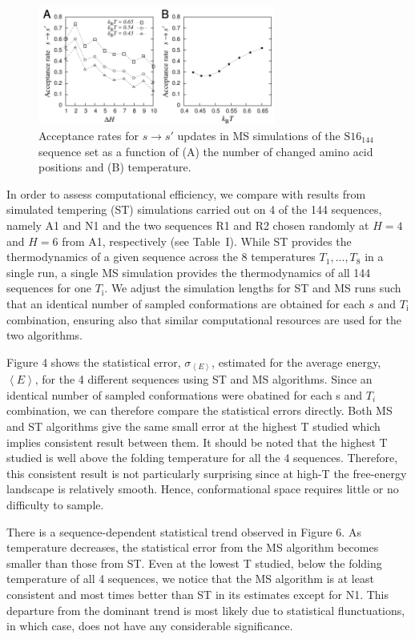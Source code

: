 \documentclass[%
 aip,
rsi,%
 amsmath,amssymb,
 reprint,%
]{revtex4-1}
\newcommand	 {\sbar}	{{s}}
\newcommand {\sigE}	{{\sigma_{\left < E \right >}}}
\newcommand {\SR}		{${\mathrm{S16}_{144}}$}
\begin{document}
\begin{figure}
\includegraphics[width=7.8cm]{Pacc}
\caption{Acceptance rates for $\sbar\rightarrow\sbar'$ updates in MS simulations of the {\SR} sequence set as a function of (A) the number of changed amino acid positions  and (B) temperature. }
\end{figure}

In order to assess computational efficiency, we compare with results from simulated tempering (ST) simulations carried out on 4 of the 144 sequences, namely A1 and N1 and the two sequences R1 and R2 chosen randomly at $H=4$ and $H=6$ from A1, respectively (see Table~I). While ST provides the thermodynamics of a given sequence across the 8 temperatures $T_1, ..., T_8$ in a single run, a single MS simulation provides the thermodynamics of all 144 sequences for one $T_\mathrm{i}$. We adjust the simulation lengths for ST and MS runs such that an identical number of sampled conformations are obtained for each $\sbar$ and $T_\mathrm{i}$ combination, ensuring also that similar computational resources are used for the two algorithms. 

Figure 4 shows the statistical error, $\sigE$, estimated for the average energy, $\left <E\right >$, for the 4 different sequences using ST and MS algorithms. Since an identical number of sampled conformations were obatined for each s and $T_i$ combination, we can therefore compare the statistical errors directly. Both MS and ST algorithms give the same small error at the highest T studied which implies consistent result between them. It should be noted that the highest T studied is well above the folding temperature for all the 4 sequences. Therefore, this consistent result is not particularly surprising since at high-T the free-energy landscape is relatively smooth. Hence, conformational space requires little or no difficulty to sample.

There is a sequence-dependent statistical trend observed in Figure 6. As temperature decreases, the statistical error from the MS algorithm becomes smaller than those from ST. Even at the lowest T studied, below the folding temperature of all 4 sequences, we notice that the MS algorithm is at least consistent and most times better than ST in its estimates except for N1. This departure from the dominant trend is most likely due to statistical flunctuations, in which case, does not have any considerable significance.
\end{document}
